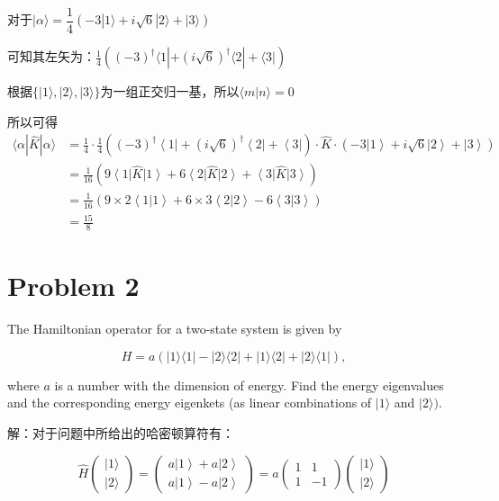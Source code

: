 \documentclass[dvipsnames, svgnames,a4paper,11pt]{article}
\begin{document}
对于$|\alpha\rangle=\dfrac{1}{4}(-3|1\rangle+i\sqrt{6}|2\rangle+|3\rangle)$

可知其左矢为：$\frac{1}{4}((-3)^{\dagger} \langle1|+(i\sqrt{6})^{\dagger} \langle2|+\langle3|)$

根据$\{|1\rangle,|2\rangle,|3\rangle\}$为一组正交归一基，所以$\langle m|n \rangle=0$

所以可得
	$$\begin{aligned}
\langle\alpha| \hat{K} |\alpha\rangle & =\frac14\cdot\frac14((-3)^\dagger\left\langle1\right|+(i\sqrt{6})^\dagger\left\langle2\right|+\left\langle3\right|)\cdot\hat{K}\cdot(-3\left|1\right\rangle+i\sqrt{6}\left|2\right\rangle+\left|3\right\rangle) \\
&=\frac{1}{16}(9\left\langle1\right|\hat{K}\left|1\right\rangle+6\left\langle2\right|\hat{K}\left|2\right\rangle+\left\langle3\right|\hat{K}\left|3\right\rangle) \\
&=\frac{1}{16}(9\times2\left\langle1|1\right\rangle+6\times3\left\langle2|2\right\rangle-6\left\langle3|3\right\rangle) \\
&=\frac{15}{8}
\end{aligned}$$
	

\section{Problem 2} 

The Hamiltonian operator for a two-state system is given by

$$H=a(|1\rangle\langle1|-|2\rangle\langle2|+|1\rangle\langle2|+|2\rangle\langle1|),$$

where $a$ is a number with the dimension of energy. Find the energy eigenvalues and the corresponding
energy eigenkets (as linear combinations of $|1\rangle$ and $|2\rangle).$

解：对于问题中所给出的哈密顿算符有：

$$\hat{H}\begin{pmatrix}|1\rangle\\|2\rangle\end{pmatrix}=\begin{pmatrix}a\left|1\right\rangle+a\left|2\right\rangle\\a\left|1\right\rangle-a\left|2\right\rangle\end{pmatrix}=a\begin{pmatrix}1&1\\1&-1\end{pmatrix}\begin{pmatrix}|1\rangle\\|2\rangle\end{pmatrix}$$
\end{document}
